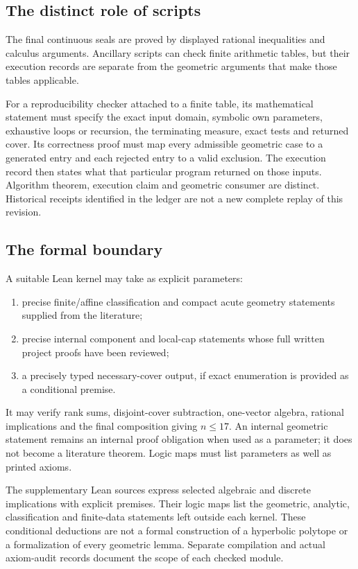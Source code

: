 \documentclass[11pt]{article}
\theoremstyle{definition}
\theoremstyle{remark}
\begin{document}
\subsection{The distinct role of scripts}
The final continuous seals are proved by displayed rational
inequalities and calculus arguments. Ancillary scripts can check
finite arithmetic tables, but their execution records are separate
from the geometric arguments that make those tables applicable.

For a reproducibility checker attached to a finite table,
its mathematical statement must specify the exact input
domain, symbolic own parameters, exhaustive loops or recursion,
the terminating measure, exact tests and returned cover.
Its correctness proof must map every admissible geometric
case to a generated entry and each rejected entry to a
valid exclusion. The execution record then states what
that particular program returned on those inputs.
Algorithm theorem, execution claim and geometric consumer
are distinct. Historical receipts identified in the ledger
are not a new complete replay of this revision.

\subsection{The formal boundary}
A suitable Lean kernel may take as explicit parameters:
\begin{enumerate}
\item precise finite/affine classification and compact acute
 geometry statements supplied from the literature;
\item precise internal component and local-cap statements whose
 full written project proofs have been reviewed;
\item a precisely typed necessary-cover output, if exact
 enumeration is provided as a conditional premise.
\end{enumerate}
It may verify rank sums, disjoint-cover subtraction,
one-vector algebra, rational implications and the final
composition giving \(n\leq17\).
An internal geometric statement remains an internal proof
obligation when used as a parameter; it does not become
a literature theorem. Logic maps must list parameters as
well as printed axioms.

The supplementary Lean sources express selected algebraic and
discrete implications with explicit premises. Their logic maps list
the geometric, analytic, classification and finite-data statements
left outside each kernel. These conditional deductions are not a
formal construction of a hyperbolic polytope or a formalization of
every geometric lemma. Separate compilation and actual axiom-audit
records document the scope of each checked module.
\end{document}
